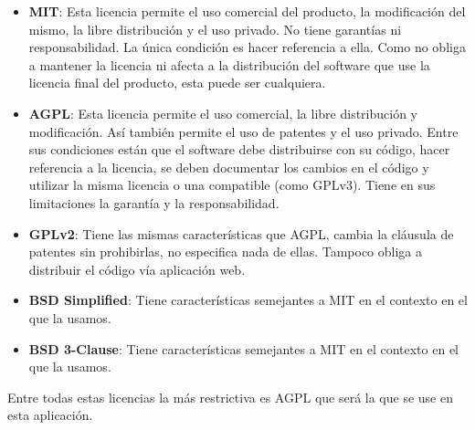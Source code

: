 \begin{itemize}
	\item \textbf{MIT}: Esta licencia permite el uso comercial del producto, la modificación del mismo, la libre distribución y el uso privado. No tiene garantías ni responsabilidad. La única condición es hacer referencia a ella. Como no obliga a mantener la licencia ni afecta a la distribución del software que use la licencia final del producto, esta puede ser cualquiera.
	
	\item \textbf{AGPL}: Esta licencia permite el uso comercial, la libre distribución y modificación. Así también permite el uso de patentes y el uso privado. Entre sus condiciones están que el software debe distribuirse con su código, hacer referencia a la licencia, se deben documentar los cambios en el código y utilizar la misma licencia o una compatible (como GPLv3). Tiene en sus limitaciones la garantía y la responsabilidad.
	
	\item \textbf{GPLv2}: Tiene las mismas características que AGPL, cambia la cláusula de patentes sin prohibirlas, no especifica nada de ellas. Tampoco obliga a distribuir el código vía aplicación web.	
	
	\item \textbf{BSD Simplified}: Tiene características semejantes a MIT en el contexto en el que la usamos.
	
	\item \textbf{BSD 3-Clause}: Tiene características semejantes a MIT en el contexto en el que la usamos.
\end{itemize}

Entre todas estas licencias la más restrictiva es AGPL que será la que se use en esta aplicación.

